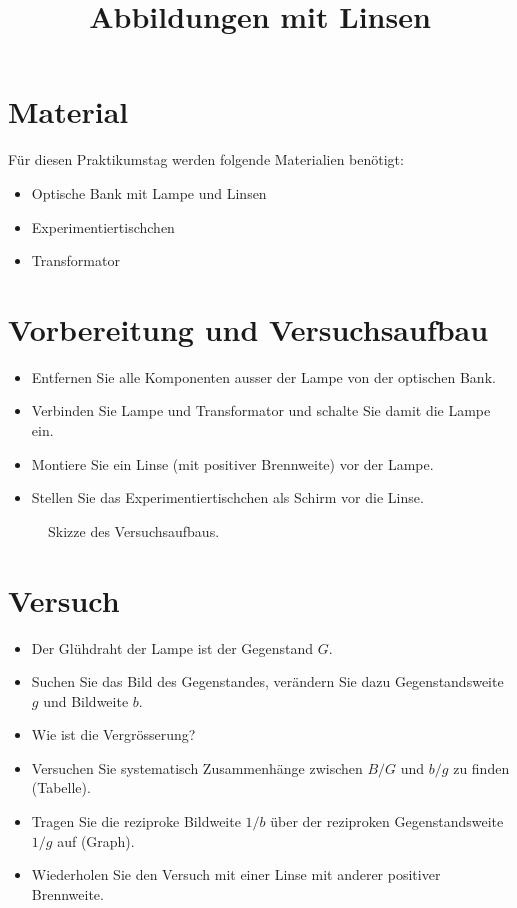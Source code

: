 \documentclass[12pt,a4paper]{article}
\author{}
\date{}
\title{Abbildungen mit Linsen}
\begin{document}
\maketitle

\section*{Material}
Für diesen Praktikumstag werden folgende Materialien benötigt:
\begin{itemize}
	\item Optische Bank mit Lampe und Linsen 
	\item Experimentiertischchen
	\item Transformator
\end{itemize}

\section*{Vorbereitung und Versuchsaufbau}

\begin{itemize}
	\item Entfernen Sie alle Komponenten ausser der Lampe von der optischen Bank.
	\item Verbinden Sie Lampe und Transformator und schalte Sie damit die Lampe ein.
	\item Montiere Sie ein Linse (mit positiver Brennweite) vor der Lampe.
	\item Stellen Sie das Experimentiertischchen als Schirm vor die Linse.
\end{itemize}


\begin{figure}[t]
	\begin{center}
	
	\caption{\label{fig1} Skizze des Versuchsaufbaus.} 
	\end{center}
\end{figure}



\section*{Versuch}
\begin{itemize}
	\item Der Glühdraht der Lampe ist der Gegenstand $G$.
	\item Suchen Sie das Bild des Gegenstandes, verändern Sie dazu Gegenstandsweite $g$ und Bildweite $b$.
	\item Wie ist die Vergrösserung?
	\item Versuchen Sie systematisch Zusammenhänge zwischen $B/G$ und $b/g$ zu finden (Tabelle).
	\item Tragen Sie die reziproke Bildweite $1/b$ über der reziproken Gegenstandsweite $1/g$ auf (Graph).
	\item Wiederholen Sie den Versuch mit einer Linse mit anderer positiver Brennweite.
\end{itemize}
\end{document}
